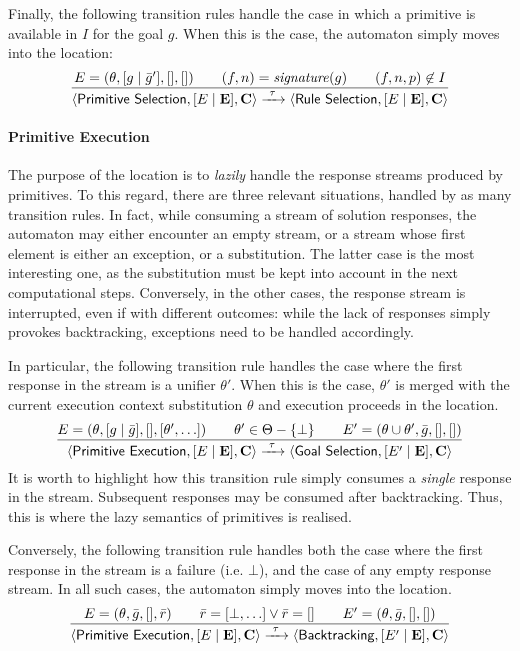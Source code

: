 \documentclass[12pt,a4paper,openright,twoside]{book}
\begin{document}
Finally, the following transition rules handle the case in which a primitive is available in $I$ for the goal $g$.
%
When this is the case, the automaton simply moves into the  location:
%
\[
\frac{
    E = (\theta, [g \mid \bar{g}'], [], [])
    \qquad
    (f, n) = \mathit{signature}(g)
    \qquad
    (f, n, p) \not\in I
}{
    \langle \textsf{Primitive Selection}, [E \mid \mathbf{E}], \mathbf{C} \rangle
    \xrightarrow{\ \tau\ }
    \langle \textsf{Rule Selection}, [E \mid \mathbf{E}], \mathbf{C} \rangle
}
\]

\paragraph{Primitive Execution}

The purpose of the  location is to \emph{lazily} handle the response streams produced by primitives.
%
To this regard, there are three relevant situations, handled by as many transition rules.
%
In fact, while consuming a stream of solution responses, the automaton may either encounter an empty stream, or a stream whose first element is either an exception, or a substitution.
%
The latter case is the most interesting one, as the substitution must be kept into account in the next computational steps.
%
Conversely, in the other cases, the response stream is interrupted, even if with different outcomes: while the lack of responses simply provokes backtracking, exceptions need to be handled accordingly.

In particular, the following transition rule handles the case where the first response in the stream is a unifier $\theta'$.
%
When this is the case, $\theta'$ is merged with the current execution context substitution $\theta$ and execution proceeds in the  location.
%
\[
\frac{
    E = (\theta, [g \mid \bar{g}], [], [\theta', \ldots])
    \qquad
    \theta' \in \Theta - \{ \bot \}
    \qquad
    E' = (\theta \cup \theta', \bar{g}, [], [])
}{
    \langle \textsf{Primitive Execution}, [E \mid \mathbf{E}], \mathbf{C} \rangle
    \xrightarrow{\ \tau\ }
    \langle \textsf{Goal Selection}, [E' \mid \mathbf{E}], \mathbf{C} \rangle
}
\]
%
It is worth to highlight how this transition rule simply consumes a \emph{single} response in the stream.
%
Subsequent responses may be consumed after backtracking.
%
Thus, this is where the lazy semantics of primitives is realised.

Conversely, the following transition rule handles both the case where the first response in the stream is a failure (i.e. $\bot$), and the case of any empty response stream.
%
In all such cases, the automaton simply moves into the  location.
\[
\frac{
    E = (\theta, \bar{g}, [], \bar{r})
    \qquad
    \bar{r} = [\bot, \ldots] \lor \bar{r} = []
    \qquad
    E' = (\theta, \bar{g}, [], [])
}{
    \langle \textsf{Primitive Execution}, [E \mid \mathbf{E}], \mathbf{C} \rangle
    \xrightarrow{\ \tau\ }
    \langle \textsf{Backtracking}, [E' \mid \mathbf{E}], \mathbf{C} \rangle
}
\]
\end{document}
